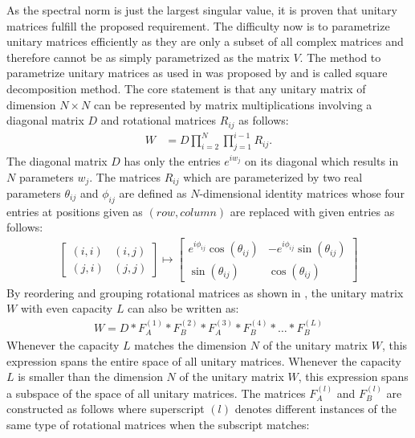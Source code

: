 \documentclass[draft,final]{vutinfth} %
\begin{document}
    As the spectral norm is just the largest singular value, it is proven that unitary matrices fulfill the proposed requirement.
    The difficulty now is to parametrize unitary matrices efficiently as they are only a subset of all complex matrices and therefore cannot be as simply parametrized as the matrix $V$.
    The method to parametrize unitary matrices as used in \cite[p. 3]{EfficientUnitaryRNNs} was proposed by \cite{UnitaryMatrixParametrization} and is called square decomposition method. 
    The core statement is that any unitary matrix of dimension $N \times N$ can be represented by matrix multiplications involving a diagonal matrix $D$ and rotational matrices $R_{ij}$ as follows:
    \begin{align}
    W &= D \prod_{i=2}^N \prod_{j=1}^{i-1} R_{ij}.
    \end{align}
    The diagonal matrix $D$ has only the entries $e^{iw_j}$ on its diagonal which results in $N$ parameters $w_j$.
    The matrices $R_{ij}$ which are parameterized by two real parameters $\theta_{ij}$ and $\phi_{ij}$ are defined as $N$-dimensional identity matrices whose four entries at positions given as $(row,column)$ are replaced with given entries as follows:
    \begin{align}
    \begin{bmatrix} 
    (i,i) & (i,j) \\
    (j,i) & (j,j) 
    \end{bmatrix} \mapsto 
    \begin{bmatrix} 
    e^{i\phi_{ij}}\cos (\theta_{ij})  & -e^{i\phi_{ij}}\sin (\theta_{ij}) \\
    \sin (\theta_{ij}) & \cos (\theta_{ij}) 
    \end{bmatrix}
    \end{align}
    By reordering and grouping rotational matrices as shown in \cite[p. 4]{EfficientUnitaryRNNs}, the unitary matrix $W$ with even capacity $L$ can also be written as:
    \begin{align}
    W = D * F_A^{(1)} * F_B^{(2)} * F_A^{(3)} * F_B^{(4)} * \ldots * F_B^{(L)}
    \end{align}
    Whenever the capacity $L$ matches the dimension $N$ of the unitary matrix $W$, this expression spans the entire space of all unitary matrices. 
    Whenever the capacity $L$ is smaller than the dimension $N$ of the unitary matrix $W$, this expression spans a subspace of the space of all unitary matrices. 
    The matrices $F_A^{(l)}$ and $F_B^{(l)}$ are constructed as follows where superscript $(l)$ denotes different instances of the same type of rotational matrices when the subscript matches:
\end{document}
